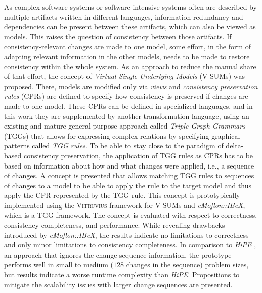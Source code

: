 
\Abstract
As complex software systems or software-intensive systems often are described by multiple artifacts written in different languages, information redundancy and dependencies can be present between these artifacts, which can also be viewed as models. This raises the question of consistency between those artifacts. 
If consistency-relevant changes are made to one model, some effort, in the form of adapting relevant information in the other models, needs to be made to restore consistency within the whole system. 
As an approach to reduce the manual share of that effort, the concept of \emph{Virtual Single Underlying Models} (V-SUMs) was proposed. There, models are modified only via \emph{views} and \emph{consistency preservation rules} (CPRs) are defined to specify how consistency is preserved if changes are made to one model.
These CPRs can be defined in specialized languages, and in this work they are supplemented by another transformation language, using an existing and mature general-purpose approach called \emph{Triple Graph Grammars} (TGGs) that allows for expressing complex relations by specifying graphical patterns called \emph{TGG rules}. 
To be able to stay close to the paradigm of delta-based consistency preservation, the application of TGG rules as CPRs has to be based on information about how and what changes were applied, i.e., a sequence of changes.
A concept is presented that allows matching TGG rules to sequences of changes to a model to be able to apply the rule to the target model and thus apply the CPR represented by the TGG rule.
This concept is prototypically implemented using the \textsc{Vitruvius} framework for V-SUMs and \emph{eMoflon::IBeX}, which is a TGG framework.
The concept is evaluated with respect to correctness, consistency completeness, and performance.
While revealing drawbacks introduced by \emph{eMoflon::IBeX}, the results indicate no limitations to correctness and only minor limitations to consistency completeness. In comparison to \emph{HiPE} \cite{hipe-devops_highly_2022}, an approach that ignores the change sequence information, the prototype performs well in small to medium ($128$ changes in the sequence) problem sizes, but results indicate a worse runtime complexity than \emph{HiPE}. Propositions to mitigate the scalability issues with larger change sequences are presented.

